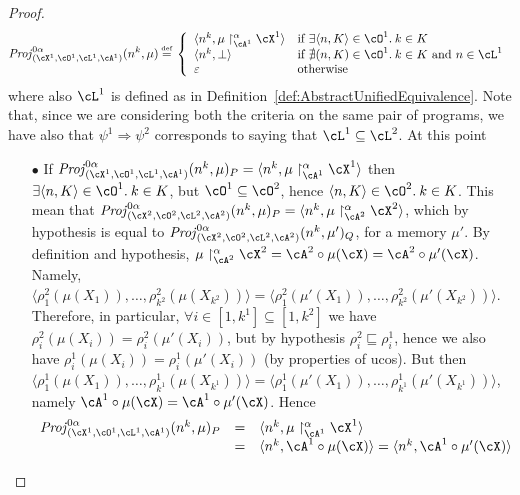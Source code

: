\documentclass[prodmode,acmtocl]{acmsmall}
\newcommand{\caX}{\cX}
\def\prog{\ensuremath{P}\xspace}
\def\progq{\ensuremath{Q}\xspace}
\def\memory{\ensuremath{\mu}\xspace}
\def\uco{\ensuremath{\rho}\xspace}
\newcommand{\ABSMEM}[3]{#1 \upharpoonright^\alpha_{#3} #2}
\def\Proj{\ensuremath{\mathit{Proj}}\xspace}
\newcommand{\Ra}{\Rightarrow}
\def\defi{\mbox{\raisebox{0ex}[1ex][1ex]{$\stackrel{\mbox{\tiny
def}}{\; =\;}$}}}
\def\tuple#1{\langle #1 \rangle}
\newcommand{\0}{\mbox{\bf 0}}
\begin{document}
\begin{proof}
  \[ \Proj^{0\alpha}_{(\caX^1, \cO^1, \cL^1,
    \cA^1)}(n^k, \memory) \defi \left\{
  \begin{array}{l l}
    \tuple{n^k, \ABSMEM{\memory}{\caX^1}{\cA^1}} & \mbox{if }
      \exists\tuple{n,K}\in \cO^1.\:k \in K \\ \tuple{n^k,\bot}
      & \mbox{if }
      \nexists(n,K) \in \cO^1.\:k \in K\mbox{ and }n\in \cL^1 \\
    \varepsilon &
    \mbox{otherwise}
  \end{array}
  \right.
  \]
  where also $\cL^1$ is defined as in
  Definition~\ref{def:AbstractUnifiedEquivalence}.  Note that, since
  we are considering both the criteria on the same pair of programs,
  we have also that $\psi^1\Ra\psi^2$ corresponds to saying that
  $\cL^1\subseteq\cL^2$. At this point
  \begin{itemize}
  \item[$\bullet$] If $\Proj^{0\alpha}_{(\caX^1, \cO^1, \cL^1,
    \cA^1)}(n^k, \memory)_\prog=\tuple{n^k,
    \ABSMEM{\memory}{\caX^1}{\cA^1}}$ then $\exists\tuple{n,K}\in
    \cO^1.\:k \in K$, but $\cO^1\subseteq\cO^2$, hence $\tuple{n,K}\in
    \cO^2.\:k \in K$. This mean that $\Proj^{0\alpha}_{(\caX^2, \cO^2,
      \cL^2, \cA^2)}(n^k, \memory)_\prog=\tuple{n^k,
      \ABSMEM{\memory}{\caX^2}{\cA^2}}$, which by hypothesis is equal
    to $\Proj^{0\alpha}_{(\caX^2, \cO^2, \cL^2,\cA^2)}(n^k,
    \memory')_\progq$, for a memory $\memory'$. By definition and
    hypothesis, $\ABSMEM{\memory}{\caX^2}{\cA^2}=\cA^2 \circ
    \memory(\caX)=\cA^2 \circ \memory'(\caX)$. Namely,
    $\tuple{\uco_{1}^2(\memory(X_{1})),\ldots,
      \uco_{k^2}^{2}(\memory(X_{k^2}))}=\tuple{\uco_{1}^2(\memory'(X_{1})),\ldots,
      \uco_{k^2}^2(\memory'(X_{k^2}))}$.  Therefore, in particular,
    $\forall i\in[1,k^1]\subseteq[1,k^2]$ we have
    $\uco_i^2(\memory(X_i))=\uco_i^2(\memory'(X_i))$, but by
    hypothesis $\uco^2_i\sqsubseteq\uco^1_i$, hence we also have
    $\uco_i^1(\memory(X_i))=\uco_i^1(\memory'(X_i))$ (by properties of
    ucos). But then $\tuple{\uco_{1}^1(\memory(X_{1})),\ldots,
      \uco_{k^1}^{1}(\memory(X_{k^1}))}=\tuple{\uco_{1}^1(\memory'(X_{1})),\ldots,
      \uco_{k^1}^1(\memory'(X_{k^1}))}$, namely $\cA^1 \circ
    \memory(\caX)=\cA^1 \circ \memory'(\caX)$. Hence
    \[
    \begin{array}{lll}
    \Proj^{0\alpha}_{(\caX^1, \cO^1, \cL^1,
    \cA^1)}(n^k, \memory)_\prog&=&
    \tuple{n^k,\ABSMEM{\memory}{\caX^1}{\cA^1}}\\
    &=&\tuple{n^k,\cA^1 \circ \memory(\caX)}=\tuple{n^k,\cA^1 \circ \memory'(\caX)}\\

\end{array}\]
\end{itemize}
\end{proof}
\end{document}
